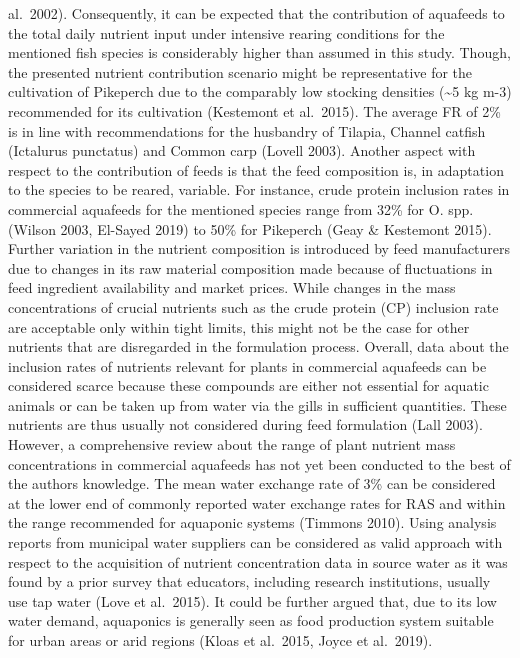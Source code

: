 \documentclass[preprint, 3p,
authoryear]{elsarticle} %
\begin{document}
al.~2002). Consequently, it can be expected that the contribution of
aquafeeds to the total daily nutrient input under intensive rearing
conditions for the mentioned fish species is considerably higher than
assumed in this study. Though, the presented nutrient contribution
scenario might be representative for the cultivation of Pikeperch due to
the comparably low stocking densities (\textasciitilde5 kg m-3)
recommended for its cultivation (Kestemont et al.~2015). The average FR
of 2\% is in line with recommendations for the husbandry of Tilapia,
Channel catfish (Ictalurus punctatus) and Common carp (Lovell 2003).
Another aspect with respect to the contribution of feeds is that the
feed composition is, in adaptation to the species to be reared,
variable. For instance, crude protein inclusion rates in commercial
aquafeeds for the mentioned species range from 32\% for O. spp. (Wilson
2003, El-Sayed 2019) to 50\% for Pikeperch (Geay \& Kestemont 2015).
Further variation in the nutrient composition is introduced by feed
manufacturers due to changes in its raw material composition made
because of fluctuations in feed ingredient availability and market
prices. While changes in the mass concentrations of crucial nutrients
such as the crude protein (CP) inclusion rate are acceptable only within
tight limits, this might not be the case for other nutrients that are
disregarded in the formulation process. Overall, data about the
inclusion rates of nutrients relevant for plants in commercial aquafeeds
can be considered scarce because these compounds are either not
essential for aquatic animals or can be taken up from water via the
gills in sufficient quantities. These nutrients are thus usually not
considered during feed formulation (Lall 2003). However, a comprehensive
review about the range of plant nutrient mass concentrations in
commercial aquafeeds has not yet been conducted to the best of the
authors knowledge. The mean water exchange rate of 3\% can be considered
at the lower end of commonly reported water exchange rates for RAS and
within the range recommended for aquaponic systems (Timmons 2010). Using
analysis reports from municipal water suppliers can be considered as
valid approach with respect to the acquisition of nutrient concentration
data in source water as it was found by a prior survey that educators,
including research institutions, usually use tap water (Love et
al.~2015). It could be further argued that, due to its low water demand,
aquaponics is generally seen as food production system suitable for
urban areas or arid regions (Kloas et al.~2015, Joyce et al.~2019).
\end{document}
